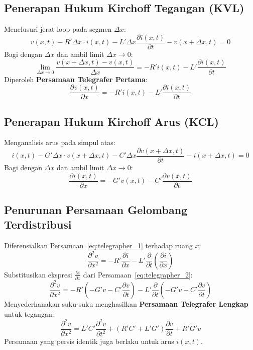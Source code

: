 \documentclass[11pt,a4paper]{article}
\theoremstyle{definition}
\begin{document}
\subsection{Penerapan Hukum Kirchoff Tegangan (KVL)}
Menelusuri jerat loop pada segmen $\Delta x$:
\begin{equation}
    v(x, t) - R'\Delta x \cdot i(x, t) - L'\Delta x \frac{\partial i(x, t)}{\partial t} - v(x + \Delta x, t) = 0
\end{equation}
Bagi dengan $\Delta x$ dan ambil limit $\Delta x \to 0$:
\begin{equation}
    \lim_{\Delta x \to 0} \frac{v(x + \Delta x, t) - v(x, t)}{\Delta x} = -R' i(x, t) - L' \frac{\partial i(x, t)}{\partial t}
\end{equation}
Diperoleh \textbf{Persamaan Telegrafer Pertama}:
\begin{equation}
    \frac{\partial v(x, t)}{\partial x} = -R' i(x, t) - L' \frac{\partial i(x, t)}{\partial t}
    \label{eq:telegrapher_1}
\end{equation}

\subsection{Penerapan Hukum Kirchoff Arus (KCL)}
Menganalisis arus pada simpul atas:
\begin{equation}
    i(x, t) - G'\Delta x \cdot v(x + \Delta x, t) - C'\Delta x \frac{\partial v(x + \Delta x, t)}{\partial t} - i(x + \Delta x, t) = 0
\end{equation}
Bagi dengan $\Delta x$ dan ambil limit $\Delta x \to 0$:
\begin{equation}
    \frac{\partial i(x, t)}{\partial x} = -G' v(x, t) - C' \frac{\partial v(x, t)}{\partial t}
    \label{eq:telegrapher_2}
\end{equation}

\subsection{Penurunan Persamaan Gelombang Terdistribusi}
Diferensialkan Persamaan~\eqref{eq:telegrapher_1} terhadap ruang $x$:
\begin{equation*}
    \frac{\partial^2 v}{\partial x^2} = -R' \frac{\partial i}{\partial x} - L' \frac{\partial}{\partial t}\left(\frac{\partial i}{\partial x}\right)
\end{equation*}
Substitusikan ekspresi $\frac{\partial i}{\partial x}$ dari Persamaan~\eqref{eq:telegrapher_2}:
\begin{equation*}
    \frac{\partial^2 v}{\partial x^2} = -R'\left(-G' v - C' \frac{\partial v}{\partial t}\right) - L' \frac{\partial}{\partial t}\left(-G' v - C' \frac{\partial v}{\partial t}\right)
\end{equation*}
Menyederhanakan suku-suku menghasilkan \textbf{Persamaan Telegrafer Lengkap} untuk tegangan:
\begin{equation}
    \frac{\partial^2 v}{\partial x^2} = L'C' \frac{\partial^2 v}{\partial t^2} + (R'C' + L'G') \frac{\partial v}{\partial t} + R'G' v
    \label{eq:telegrapher_general_v}
\end{equation}
Persamaan yang persis identik juga berlaku untuk arus $i(x, t)$.
\end{document}
